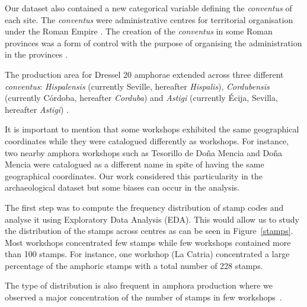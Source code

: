 \documentclass[review]{elsarticle}
\newcommand{\memo}[2]{\textcolor{#1}{#2}}
\newcommand{\maria}[1]{\memo{red}{MC: #1\\}}
\newcommand{\xavi}[1]{\memo{magenta}{XRC: #1\\}}
\begin{document}

Our dataset also contained a new categorical variable defining the \textit{conventus} of each site. The \textit{conventus} were administrative centres for territorial organisation under the Roman Empire \citep[58]{ozcariz_gil_administracion_2013}.
The creation of the \textit{conventus} in some Roman provinces was a form of control with the purpose of organising the administration in the provinces \citep{albertini_les_1923}.


The production area for Dressel 20 amphorae extended across three different \textit{conventus}: \textit{Hispalensis} (currently Seville, hereafter \textit{Hispalis}), \textit{Cordubensis} (currently C\'ordoba, hereafter \textit{Corduba}) and \textit{Astigi} (currently Écija, Sevilla, hereafter \textit{Astigi}) \citep{rodriguez_economioleicola_1977,chicdatos2001,berni_millet_epigrafianforica_2008} . 


It is important to mention that some workshops exhibited the same geographical coordinates while they were catalogued differently as workshops. For instance, two nearby amphora workshops such as Tesorillo de Doña Mencia and Doña Mencia were catalogued as a different name in spite of having the same geographical coordinates. Our work considered this particularity in the archaeological dataset but some biases can occur in the analysis. 

The first step was to compute the frequency distribution of stamp codes and analyse it using Exploratory Data Analysis (EDA). This would allow us to study the distribution of the stamps across centres as can be seen in Figure~\ref{stamps}. Most workshops concentrated few stamps while few workshops contained more than 100 stamps. For instance, one workshop (La Catria) concentrated a large percentage of the amphoric stamps with a total number of 228 stamps.

The type of distribution is also frequent in amphora production where we observed a major concentration of the number of stamps in few workshops~\citep{bayesian_2018,coto-sarmiento_identifying_2018}.


\end{document}
